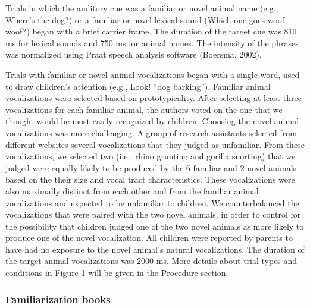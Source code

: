 \documentclass[english,floatsintext,man]{apa6}
\newcounter{author}
\theoremstyle{definition}
\theoremstyle{definition}
\theoremstyle{definition}
\theoremstyle{remark}
\begin{document}
Trials in which the auditory cue was a familiar or novel animal name
(e.g., Where's the dog?) or a familiar or novel lexical sound (Which one
goes woof-woof?) began with a brief carrier frame. The duration of the
target cue was 810 ms for lexical sounds and 750 ms for animal names.
The intensity of the phrases was normalized using Praat speech analysis
software (Boersma, 2002).

Trials with familiar or novel animal vocalizations began with a single
word, used to draw children's attention (e.g., Look! \enquote{dog
barking}). Familiar animal vocalizations were selected based on
prototypicality. After selecting at least three vocalizations for each
familiar animal, the authors voted on the one that we thought would be
most easily recognized by children. Choosing the novel animal
vocalizations was more challenging. A group of research assistants
selected from different websites several vocalizations that they judged
as unfamiliar. From these vocalizations, we selected two (i.e., rhino
grunting and gorilla snorting) that we judged were equally likely to be
produced by the 6 familiar and 2 novel animals based on the their size
and vocal tract characteristics. These vocalizations were also maximally
distinct from each other and from the familiar animal vocalizations and
expected to be unfamiliar to children. We counterbalanced the
vocalizations that were paired with the two novel animals, in order to
control for the possibility that children judged one of the two novel
animals as more likely to produce one of the novel vocalization. All
children were reported by parents to have had no exposure to the novel
animal's natural vocalizations. The duration of the target animal
vocalizations was 2000 ms. More details about trial types and conditions
in Figure 1 will be given in the Procedure section.

\hypertarget{familiarization-books}{%
\subsubsection{Familiarization books}\label{familiarization-books}}
\end{document}

